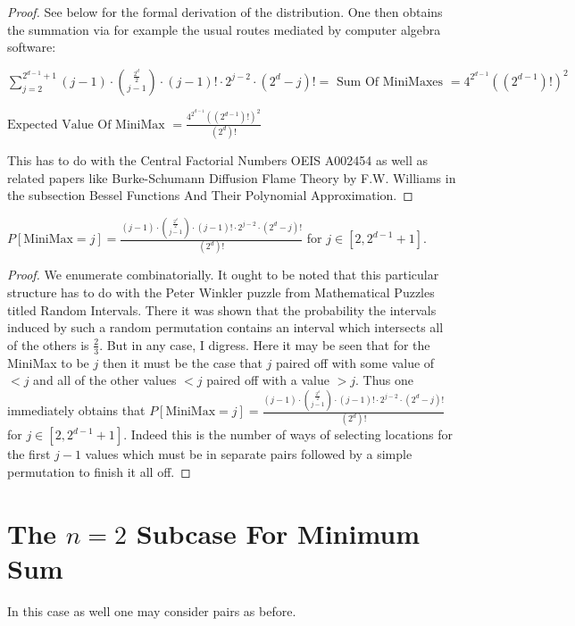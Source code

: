 \documentclass[12pt]{article}
\begin{document}
\begin{proof}
	See below for the formal derivation of the distribution. One then obtains the summation via for example the usual routes mediated by computer algebra software:

	$\sum_{j=2}^{2^{d-1}+1} (j-1) \cdot \binom{\frac{2^d}{2}}{j-1} \cdot (j-1)! \cdot 2^{j-2} \cdot (2^d-j)! = \text{ Sum Of MiniMaxes } = 4^{2^{d-1}}((2^{d-1})!)^2$

	$\text{Expected Value Of MiniMax } = \frac{4^{2^{d-1}}((2^{d-1})!)^2}{(2^d)!}$

	This has to do with the Central Factorial Numbers OEIS A002454 as well as related papers like Burke-Schumann Diffusion Flame Theory by F.W. Williams in the subsection Bessel Functions And Their Polynomial Approximation.
\end{proof}

\begin{theorem}\label{Thm:$n = 2$ MiniMax Distribution}
	$P[\text{MiniMax} = j] = \frac{(j-1) \cdot \binom{\frac{2^d}{2}}{j-1} \cdot (j-1)! \cdot 2^{j-2} \cdot (2^d-j)!}{(2^d)!}$ for $j \in [2 , 2^{d-1}+1]$.
\end{theorem}

\begin{proof}
	We enumerate combinatorially. It ought to be noted that this particular structure has to do with the Peter Winkler puzzle from Mathematical Puzzles titled Random Intervals. There it was shown that the probability the intervals induced by such a random permutation contains an interval which intersects all of the others is $\frac{2}{3}$. But in any case, I digress. Here it may be seen that for the MiniMax to be $j$ then it must be the case that $j$ paired off with some value of $<j$ and all of the other values $<j$ paired off with a value $>j$. Thus one immediately obtains that $P[\text{MiniMax} = j] = \frac{(j-1) \cdot \binom{\frac{2^d}{2}}{j-1} \cdot (j-1)! \cdot 2^{j-2} \cdot (2^d-j)!}{(2^d)!}$ for $j \in [2 , 2^{d-1}+1]$. Indeed this is the number of ways of selecting locations for the first $j-1$ values which must be in separate pairs followed by a simple permutation to finish it all off.
\end{proof}

\section{The $n = 2$ Subcase For Minimum Sum}

In this case as well one may consider pairs as before.
\end{document}
